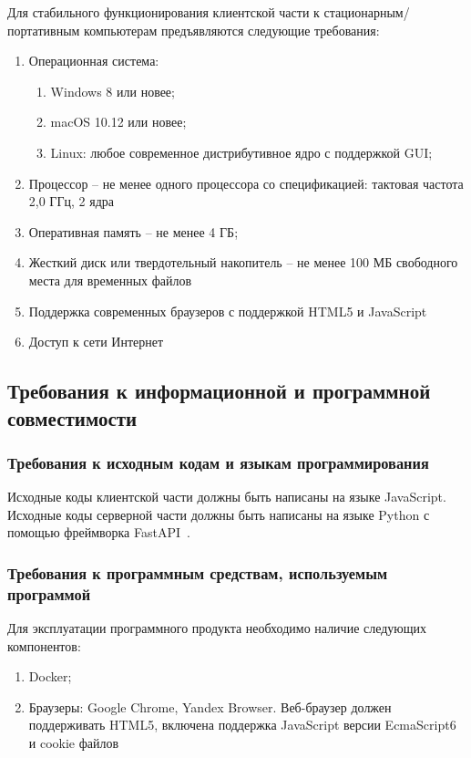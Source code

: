 \documentclass[a4paper,12pt,reqno]{article}
\begin{document}
    Для стабильного функционирования клиентской части к стационарным/портативным компьютерам предъявляются следующие требования:
    \begin{enumerate}
        \item Операционная система:
        \begin{enumerate}[label=\arabic{enumi}.\arabic*.]
            \item Windows 8 или новее;
            \item macOS 10.12 или новее;
            \item Linux: любое современное дистрибутивное ядро с поддержкой GUI;
        \end{enumerate}
        \item Процессор – не менее одного процессора со спецификацией: тактовая частота 2,0 ГГц, 2 ядра
        \item Оперативная память – не менее 4 ГБ;
        \item Жесткий диск или твердотельный накопитель – не менее 100 МБ свободного места для временных файлов
        \item Поддержка современных браузеров с поддержкой HTML5 и JavaScript
        \item Доступ к сети Интернет
    \end{enumerate}

    \subsection{Требования к информационной и программной совместимости}

    \subsubsection{Требования к исходным кодам и языкам программирования}
    Исходные коды клиентской части должны быть написаны на языке JavaScript.
    Исходные коды серверной части должны быть написаны на языке Python с помощью фреймворка FastAPI~\cite{Framework:FastAPI}.

    \subsubsection{Требования к программным средствам, используемым программой}
    Для эксплуатации программного продукта необходимо наличие следующих компонентов:
    \begin{enumerate}
        \item Docker;
        \item Браузеры: Google Chrome, Yandex Browser. Веб-браузер должен поддерживать HTML5, включена поддержка JavaScript версии EcmaScript6 и cookie файлов
    \end{enumerate}
\end{document}
